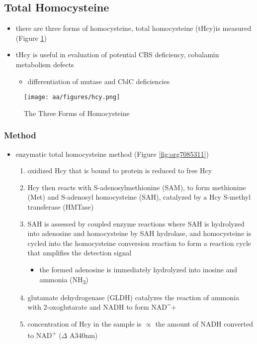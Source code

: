 \documentclass[12pt]{scrartcl}
\begin{document}
\subsection{Total Homocysteine}
\label{sec:orgee97a78}
\begin{itemize}
\item there are three forms of homocysteine, total homocysteine (tHcy)is
measured (Figure \ref{fig:org556cda7})
\item tHcy is useful in evaluation of potential CBS deficiency, cobalamin
metabolism defects
\begin{itemize}
\item differentiation of mutase and CblC deficiencies
\end{itemize}
\end{itemize}


\begin{figure}[htbp]
\centering
\texttt{[image: aa/figures/hcy.png]}
\caption{\label{fig:org556cda7}The Three Forms of Homocysteine}
\end{figure}

\subsubsection{Method}
\label{sec:org0e57833}
\begin{itemize}
\item enzymatic total homocysteine method (Figure \ref{fig:org7085311})
\begin{enumerate}
\item oxidized Hcy that is bound to protein is reduced to free Hcy
\item Hcy then reacts with S-adenosylmethionine (SAM), to form methionine
(Met) and S-adenosyl homocysteine (SAH), catalyzed by a Hcy
S-methyl transferase (HMTase)
\item SAH is assessed by coupled enzyme reactions where SAH is hydrolyzed
into adenosine and homocysteine by SAH hydrolase, and homocysteine
is cycled into the homocysteine conversion reaction to form a
reaction cycle that amplifies the detection signal
\begin{itemize}
\item the formed adenosine is immediately hydrolyzed into inosine and
ammonia (NH\textsubscript{3})
\end{itemize}
\item glutamate dehydrogenase (GLDH) catalyzes the reaction of ammonia
with 2-oxoglutarate and NADH to form NAD\^{}+
\item concentration of Hcy in the sample is \(\propto\) the amount of NADH
converted to NAD\textsuperscript{+} (\(\Delta\) A340nm)
\end{enumerate}
\end{itemize}
\end{document}
